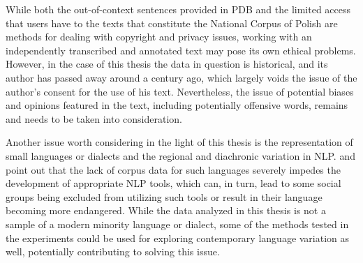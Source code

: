 While both the out-of-context sentences provided in PDB and the limited access that users have to the texts that constitute the National Corpus of Polish are methods for dealing with copyright and privacy issues, working with an independently transcribed and annotated text may pose its own ethical problems. However, in the case of this thesis the data in question is historical, and its author has passed away around a century ago, which largely voids the issue of the author's consent for the use of his text. Nevertheless, the issue of potential biases and opinions featured in the text, including potentially offensive words, remains and needs to be taken into consideration.

Another issue worth considering in the light of this thesis is the representation of small languages or dialects and the regional and diachronic variation in NLP. \citet{mcenery-etal-2000-corpus} and \citet{soria-etal-2016-fostering} point out that the lack of corpus data for such languages severely impedes the development of appropriate NLP tools, which can, in turn, lead to some social groups being excluded from utilizing such tools or result in their language becoming more endangered. While the data analyzed in this thesis is not a sample of a modern minority language or dialect, some of the methods tested in the experiments could be used for exploring contemporary language variation as well, potentially contributing to solving this issue. 



